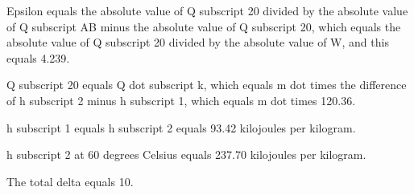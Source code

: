 Epsilon equals the absolute value of Q subscript 20 divided by the absolute value of Q subscript AB minus the absolute value of Q subscript 20, which equals the absolute value of Q subscript 20 divided by the absolute value of W, and this equals 4.239.

Q subscript 20 equals Q dot subscript k, which equals m dot times the difference of h subscript 2 minus h subscript 1, which equals m dot times 120.36.

h subscript 1 equals h subscript 2 equals 93.42 kilojoules per kilogram.

h subscript 2 at 60 degrees Celsius equals 237.70 kilojoules per kilogram.

The total delta equals 10.